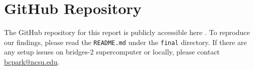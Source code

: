 \documentclass{article}
\begin{document}
\section{GitHub Repository}
The GitHub repository for this report is publicly accessible here \cite{final-repo}. To reproduce our findings, please read the \verb|README.md| under the \verb|final| directory. If there are any setup issues on bridges-2 supercomputer or locally, please contact \href{mailto:bcpark@ncsu.edu}{bcpark@ncsu.edu}.



\end{document}
